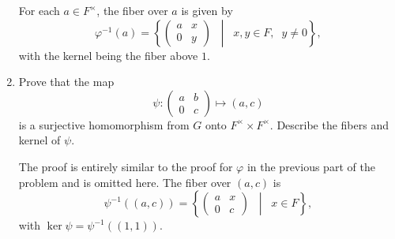 \begin{enumerate}
\begin{solution}
    For each $a\in F^\times$, the fiber over $a$ is given by
    \begin{equation*}
      \varphi^{-1}(a) =
      \left\{
        \begin{pmatrix}
          a & x \\
          0 & y
        \end{pmatrix}
        \;\;\middle|\;\;
        x,y\in F,\;\;y\neq0
      \right\},
    \end{equation*}
    with the kernel being the fiber above $1$.
  \end{solution}

\item Prove that the map
  \begin{equation*}
    \psi\colon
    \begin{pmatrix}
      a & b \\ 0 & c
    \end{pmatrix}
    \mapsto (a,c)
  \end{equation*}
  is a surjective homomorphism from $G$ onto
  $F^\times\times F^\times$. Describe the fibers and kernel of $\psi$.
  \begin{solution}
    The proof is entirely similar to the proof for $\varphi$ in the
    previous part of the problem and is omitted here. The fiber over
    $(a,c)$ is
    \begin{equation*}
      \psi^{-1}((a,c)) =
      \left\{
        \begin{pmatrix}
          a & x \\
          0 & c
        \end{pmatrix}
        \;\;\middle|\;\;
        x\in F
      \right\},
    \end{equation*}
    with $\ker\psi = \psi^{-1}((1,1))$.
  \end{solution}


\end{enumerate}
